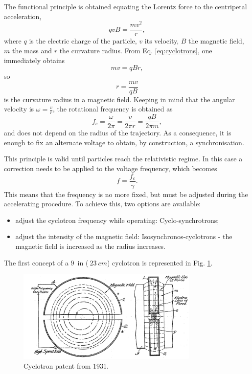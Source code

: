 The functional principle is obtained equating the Lorentz force to the centripetal acceleration,
\begin{equation}
    qvB = \frac{mv^2}{r},
    \label{eq:cyclotrons}
\end{equation}
where $q$ is the electric charge of the particle, $v$ its velocity, $B$ the magnetic field, $m$ the mass and $r$ the curvature radius.
From Eq. \eqref{eq:cyclotrons}, one immediately obtains
\begin{equation*}
    mv = qBr,
\end{equation*}
so
\begin{equation*}
    r = \frac{mv}{qB}
\end{equation*}
is the curvature radius in a magnetic field. Keeping in mind that the angular velocity is $\omega = \frac{v}{r}$, the rotational frequency is obtained as
\begin{equation*}
    f_{c} = \frac{\omega}{2\pi} = \frac{v}{2\pi r} = \frac{qB}{2\pi m},
\end{equation*}
and does not depend on the radius of the trajectory. As a consequence, it is enough to fix an alternate voltage to obtain, by construction, a synchronisation.

This principle is valid until particles reach the relativistic regime. In this case a correction needs to be applied to the voltage frequency, which becomes
\begin{equation*}
    f = \frac{f_{c}}{\gamma}.
\end{equation*}
This means that the frequency is no more fixed, but must be adjusted during the accelerating procedure. To achieve this, two options are available:
\begin{itemize}
    \item adjust the cyclotron frequency while operating: Cyclo-synchrotrons;
    \item adjust the intensity of the magnetic field: Isosynchronos-cyclotrons - the magnetic field is increased as the radius increases.
\end{itemize}
The first concept of a \SI{9}{in} ($~\SI{23}{cm}$) cyclotron is represented in Fig. \ref{fig:Cyclotron}.
\begin{figure}
    \centering
    \includegraphics[width=0.8\textwidth]{Figures/Cyclotron}
    \caption{Cyclotron patent from 1931.}
    \label{fig:Cyclotron}
\end{figure}

